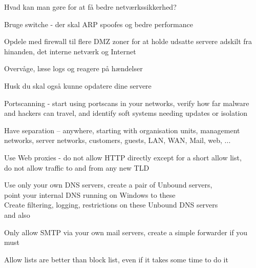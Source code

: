\documentclass[Screen16to9,17pt]{foils}
\begin{document}

\begin{list1}
\item Hvad kan man gøre for at få bedre netværkssikkerhed?
\begin{list2}
\item Bruge switche - der skal ARP spoofes og bedre performance
\item Opdele med firewall til flere DMZ zoner for at holde
      udsatte servere adskilt fra hinanden, det interne netværk og
      Internet
\item Overvåge, læse logs og reagere på hændelser
\end{list2}
\item Husk du skal også kunne opdatere dine servere
\end{list1}





\begin{list2}
\item Portscanning - start using portscans in your networks, verify how far malware and hackers can travel, and identify soft systems needing updates or isolation
\item Have separation -- anywhere, starting with organisation units, management networks, server networks, customers, guests, LAN, WAN, Mail, web, ...
\item Use Web proxies - do not allow HTTP directly except for a short allow list, \\
do not allow traffic to and from any new TLD
\item Use only your own DNS servers, create a pair of Unbound servers, \\
point your internal DNS running on Windows to these\\
Create filtering, logging, restrictions on these Unbound DNS servers\\
 and also 
\item Only allow SMTP via your own mail servers, create a simple forwarder if you must
\end{list2}

Allow lists are better than block list, even if it takes some time to do it

\end{document}

